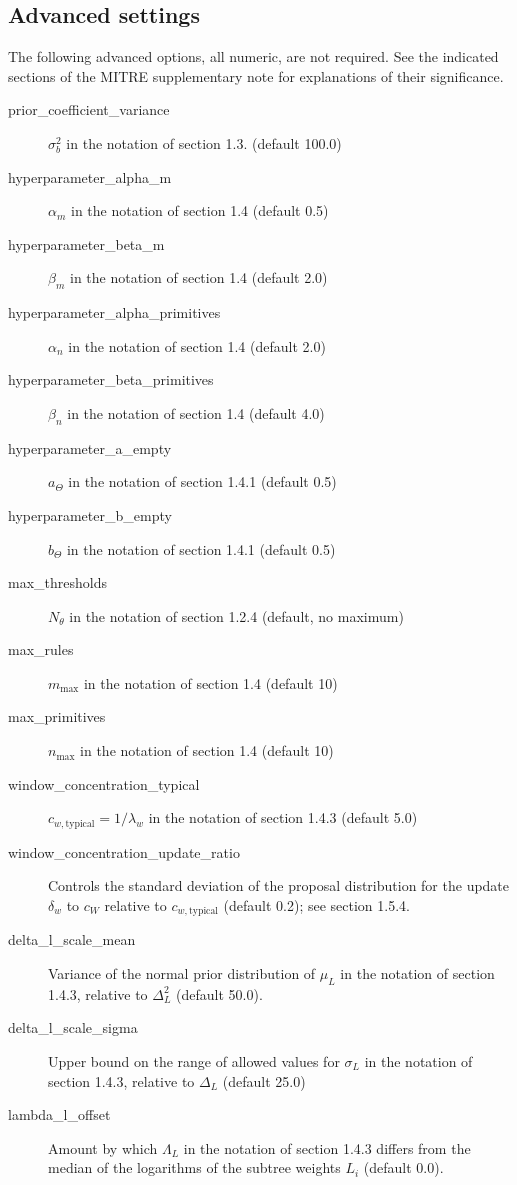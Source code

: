 \documentclass[12pt]{report}
\begin{document}
\subsection{Advanced settings}
The following advanced options, all numeric, are not required. See the
indicated sections of the MITRE
supplementary note for explanations of their significance.
\begin{description}
\item[prior\_coefficient\_variance] $\sigma_b^2$ in the notation of
  section 1.3. (default 100.0)
\item[hyperparameter\_alpha\_m] $\alpha_m$ in the notation of section 1.4 (default 0.5)
\item[hyperparameter\_beta\_m] $\beta_m$ in the notation of section 1.4 (default 2.0)
\item[hyperparameter\_alpha\_primitives] $\alpha_n$ in the notation of section 1.4 (default 2.0)
\item[hyperparameter\_beta\_primitives] $\beta_n$ in the notation of section 1.4 (default 4.0)
\item[hyperparameter\_a\_empty] $a_\Theta$ in the notation of section
  1.4.1 (default 0.5)
\item[hyperparameter\_b\_empty] $b_\Theta$ in the notation of section
  1.4.1 (default 0.5)
\item[max\_thresholds] $N_\theta$ in the notation of section 1.2.4
  (default, no maximum)
\item[max\_rules] $m_\text{max}$ in the notation of section 1.4 (default 10)
\item[max\_primitives] $n_\text{max}$ in the notation of section 1.4 (default 10)
\item[window\_concentration\_typical]
  $c_{w,\text{typical}}=1/\lambda_w$ in the notation of section 1.4.3
  (default 5.0)
\item[window\_concentration\_update\_ratio] Controls the
  standard deviation of the proposal distribution for the
  update $\delta_w$ to $c_W$ relative to $c_{w,\text{typical}}$
  (default 0.2); see section 1.5.4.
\item[delta\_l\_scale\_mean] Variance of the normal
  prior distribution of $\mu_L$ in the notation of section 1.4.3, relative
  to $\Delta_L^2$ (default 50.0). 
\item[delta\_l\_scale\_sigma] Upper bound on the range of allowed
  values for $\sigma_L$ in the notation of section 1.4.3, relative to
  $\Delta_L$ (default 25.0)
\item[lambda\_l\_offset] Amount by which $\Lambda_L$ in the notation
  of section 1.4.3 differs from the median of the logarithms of the
  subtree weights $L_i$ (default 0.0).
\end{description}
\end{document}
